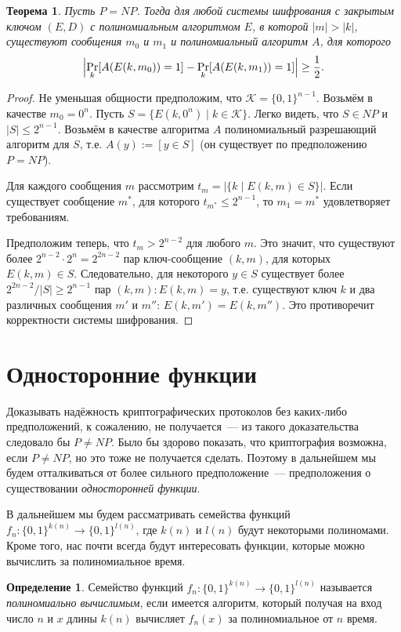 \documentclass[12pt]{article}
\newcommand{\bits}{\{0,1\}}
\theoremstyle{definition}
\newtheorem{definition}{Определение}[section]
\theoremstyle{plain}
\newtheorem{theorem}{Теорема}[section]
\theoremstyle{remark}
\begin{document}
\begin{theorem}
Пусть $P=NP$. Тогда для любой системы шифрования с закрытым ключом $(E,D)$ 
с полиномиальным алгоритмом $E$, в которой $|m|>|k|$, существуют сообщения 
$m_0$ и $m_1$ и полиномиальный алгоритм $A$, для которого
$$\Bigl|\Pr_k[A(E(k,m_0)) = 1]-\Pr_k[A(E(k,m_1)) = 1]\Bigr|\ge\frac12.$$
\end{theorem}
\begin{proof}
Не уменьшая общности предположим, что $\mathcal K = \bits^{n-1}$. 
Возьмём в качестве $m_0 = 0^n$. 
Пусть $S = \{E(k, 0^n)\mid k\in\mathcal K\}$. Легко видеть, что $S\in NP$ и $|S|\le 2^{n-1}$. Возьмём в качестве алгоритма $A$ полиномиальный разрешающий алгоритм для $S$, т.е. $A(y) := [y\in S]$ (он существует по предположению $P=NP$).

Для каждого сообщения $m$ рассмотрим $t_m = \bigl|\{k\mid E(k, m) \in S\}\bigr|$. 
Если существует сообщение $m^*$, для которого $t_{m^*} \le 2^{n-1}$, то $m_1 = m^*$ удовлетворяет требованиям. 

Предположим теперь, что $t_m > 2^{n-2}$ для любого $m$. Это значит, что существуют более $2^{n-2}\cdot 2^n = 2^{2n - 2}$ пар ключ-сообщение $(k,m)$, для которых 
$E(k,m)\in S$. Следовательно, для некоторого $y\in S$ существует более $2^{2n - 2} / |S| \ge 2^{n-1}$ пар $(k,m): E(k,m) = y$, т.е. существуют ключ $k$ и два различных сообщения $m'$ и $m''$: $E(k,m') = E(k,m'')$. Это противоречит корректности системы шифрования.
\end{proof}

\section{Односторонние функции}
Доказывать надёжность криптографических протоколов без каких-либо предположений, к сожалению, не получается~--- из такого доказательства следовало бы $P\neq NP$.
Было бы здорово показать, что криптография возможна, если $P\neq NP$, но это тоже не получается сделать. Поэтому в дальнейшем мы
будем отталкиваться от более сильного предположение~--- предположения о существовании \emph{односторонней функции}.

В дальнейшем мы будем рассматривать семейства функций $f_n: \bits^{k(n)} \to \bits^{l(n)}$, где $k(n)$ и $l(n)$ будут некоторыми полиномами. Кроме того, нас почти всегда будут интересовать
функции, которые можно вычислить за полиномиальное время.

\begin{definition}
    Семейство функций $f_n: \bits^{k(n)} \to \bits^{l(n)}$ называется 
    \emph{полиномиально вычислимым}, если имеется алгоритм, который получая на вход 
    число $n$ и $x$ длины $k(n)$ вычисляет $f_n(x)$ за полиномиальное от $n$ время.
\end{definition}
\end{document}
